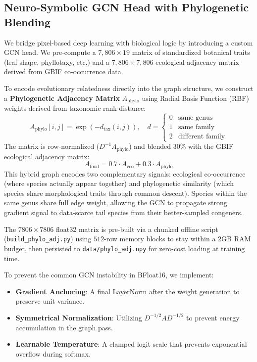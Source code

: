 \documentclass[10pt,twocolumn,letterpaper]{article}
\begin{document}
\subsection{Neuro-Symbolic GCN Head with Phylogenetic Blending}
We bridge pixel-based deep learning with biological logic by introducing a custom GCN head. We pre-compute a $7,806 \times 19$ matrix of standardized botanical traits (leaf shape, phyllotaxy, etc.) and a $7,806 \times 7,806$ ecological adjacency matrix derived from GBIF co-occurrence data.

To encode evolutionary relatedness directly into the graph structure, we construct a \textbf{Phylogenetic Adjacency Matrix} $A_{\text{phylo}}$ using Radial Basis Function (RBF) weights derived from taxonomic rank distance:
\begin{equation}
    A_{\text{phylo}}[i,j] = \exp\!\left(-d_{\text{tax}}(i,j)\right), \quad d = \begin{cases} 0 & \text{same genus} \\ 1 & \text{same family} \\ 2 & \text{different family} \end{cases}
\end{equation}
The matrix is row-normalized ($D^{-1}A_{\text{phylo}}$) and blended 30\% with the GBIF ecological adjacency matrix:
\begin{equation}
    A_{\text{final}} = 0.7 \cdot A_{\text{eco}} + 0.3 \cdot A_{\text{phylo}}
\end{equation}
This hybrid graph encodes two complementary signals: ecological co-occurrence (where species actually appear together) and phylogenetic similarity (which species share morphological traits through common descent). Species within the same genus share full edge weight, allowing the GCN to propagate strong gradient signal to data-scarce tail species from their better-sampled congeners.

The $7806 \times 7806$ float32 matrix is pre-built via a chunked offline script (\texttt{build\_phylo\_adj.py}) using $512$-row memory blocks to stay within a 2GB RAM budget, then persisted to \texttt{data/phylo\_adj.npy} for zero-cost loading at training time.

To prevent the common GCN instability in BFloat16, we implement:
\begin{itemize}
    \item \textbf{Gradient Anchoring}: A final LayerNorm after the weight generation to preserve unit variance.
    \item \textbf{Symmetrical Normalization}: Utilizing $D^{-1/2} A D^{-1/2}$ to prevent energy accumulation in the graph pass.
    \item \textbf{Learnable Temperature}: A clamped logit scale that prevents exponential overflow during softmax.
\end{itemize}
\end{document}
